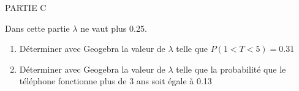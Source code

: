 \documentclass[a4paper,12pt,openany]{book}
\begin{document}
\bigskip

PARTIE C

\bigskip

Dans cette partie $\lambda$ ne vaut plus 0.25.\\

\begin{enumerate}
	\item Déterminer avec Geogebra la valeur de $\lambda$ telle que $P(1<T<5)=0.31$
	
	\item Déterminer avec Geogebra la valeur de $\lambda$ telle que la probabilité que le téléphone fonctionne plus de 3 ans soit égale à 0.13
	
\end{enumerate}
\end{document}
